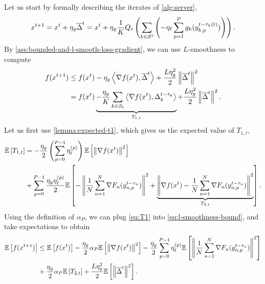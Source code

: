 Let us start by formally describing the iterates of \cref{alg:server},
\begin{equation*}
    x^{t+1} = x^t + \eta_g \overline{\Delta}^t = x^t + \eta_g \frac{1}{K} Q_c \left( \sum_{k \in \mathcal{S}^t} \left(- \eta_\ell \sum_{p=1}^P g_k(y_{k,p}^{t - \tau_k(t)}) \right) \right).
\end{equation*}
By \cref{ass:bounded-and-l-smooth-loss-gradient}, we can use $L$-smoothness to compute
\begin{equation}
    \label{eq:l-smoothness-bound}
    \begin{aligned}
        f(x^{t+1}) & \leq f(x^t) - \eta_g \left\langle \nabla f(x^t), \overline{\Delta}^t \right\rangle +\frac{L\eta^2_g}{2} \left\lVert\overline{\Delta}^t\right\rVert^2                                                      \\
                   & =   f(x^t) \underbrace{-\frac{\eta_g}{K}\sum_{k\in \mathcal{S}_t} \left\langle\nabla f(x^t),  \Delta_{k}^{t-\tau_k} \right\rangle}_{T_{1,t}} +\frac{L\eta^2_g}{2} \left\lVert\overline{\Delta}^t\right\rVert^2.
    \end{aligned}
\end{equation}
Let us first use \cref{lemma:expected-t1}, which gives us the expected value of $T_{1,t}$,
\begin{equation}
    \begin{aligned}
        \mathbb{E}\left[T_{1,t}\right]
         & = -\frac{\eta_g}{2} \left(\sum_{p=0}^{P-1} \eta^{(p)}_{\ell} \right)\mathbb{E}\left[\left\lVert\nabla f(x^t)\right\rVert^2\right]                                                                                                                                              \\
         & + \sum_{p=0}^{P-1} \frac{ \eta_g \eta^{(p)}_{\ell}}{2} \mathbb{E}\left[- \left\lVert\frac{1}{N}\sum_{n = 1}^N \nabla F_n(y^{t-\tau_n}_{n,p})\right\rVert^2 + \underbrace{\left\lVert\nabla f(x^t) -  \frac{1}{N}\sum_{n = 1}^N \nabla F_n(y^{t-\tau_n}_{n,p})\right\rVert^2}_{T_{2,t}}\right].
    \end{aligned}
    \label{eq:T1}
\end{equation}
Using the definition of $\alpha_P$, we can plug \eqref{eq:T1} into \eqref{eq:l-smoothness-bound}, and take expectations to obtain
\begin{equation}
    \begin{aligned}
        \mathbb{E}\left[f(x^{t+1})\right] & \leq \mathbb{E}\left[f(x^t)\right]  -\frac{\eta_g}{2} \alpha_P \mathbb{E}\left[\left\lVert\nabla f(x^t)\right\rVert^2\right] -\frac{\eta_g}{2}\sum_{p=0}^{P-1}\eta_{\ell}^{(p)} \mathbb{E}\left[ \left\lVert\frac{1}{N}\sum_{n = 1}^N \nabla F_n(y^{t-\tau_n}_{n,p})\right\rVert^2\right] \\
                           & +\frac{\eta_g}{2}\alpha_P\mathbb{E}\left[T_{2,t}\right] + \frac{L\eta^2_g}{2}\mathbb{E}\left[\left\lVert \overline{\Delta}^t \right\rVert^2\right].
    \end{aligned}
\end{equation}

